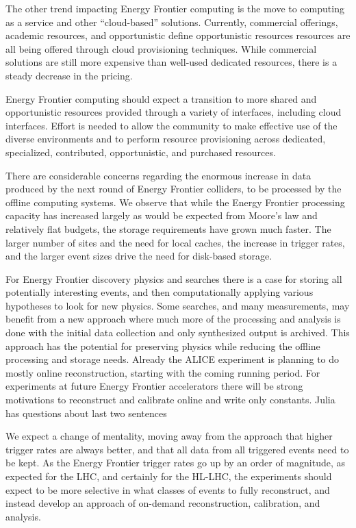 The other trend impacting Energy Frontier computing is the move to computing as a service
and other ``cloud-based'' solutions.  Currently,  commercial offerings, academic
resources, and opportunistic {\color{red} define opportunistic resources} resources are all being offered through cloud
provisioning techniques.  While commercial solutions are still more expensive
than well-used dedicated resources, there is a steady decrease in the pricing.

Energy Frontier computing should expect a transition to more shared and opportunistic
resources provided through a variety of interfaces, including cloud
interfaces.   Effort is needed to allow the community to make effective use of
the diverse environments and to perform resource provisioning across
dedicated, specialized, contributed, opportunistic, and purchased resources.

There are considerable concerns regarding the enormous increase in data
produced by the next round of Energy Frontier colliders,   to be processed by the offline
computing systems.  We observe that while the Energy Frontier processing capacity has
increased largely as would be expected from Moore's law and relatively
flat budgets, the storage requirements have grown much faster.  The larger
number of sites and the need for local caches, the increase in trigger rates,
and the larger event sizes drive the need for disk-based storage.

For Energy Frontier discovery physics and searches there is a case for storing all
potentially interesting events, and then computationally  applying various
hypotheses to look for new physics.  
Some searches, and many measurements, may benefit from a
new approach where much more of the processing and analysis is done with the
initial data collection and only synthesized output is archived.
This approach has the
potential for preserving physics while reducing the offline processing and
storage needs.  Already the ALICE experiment is planning to do mostly online
reconstruction, starting with  the coming running period.   For experiments at
future Energy Frontier accelerators there will be strong motivations to reconstruct and
calibrate online and write only constants.
{\color{red} Julia has questions about last two sentences}

We expect a change of mentality, moving away from the approach that higher
trigger rates are always better, and that all data from  all triggered events
need to be kept.   As the Energy Frontier trigger rates go up by an order of magnitude,  as
expected for the LHC, and certainly for the HL-LHC,  the experiments
should expect to be more selective in what classes of events to fully
reconstruct,  and instead develop an approach of on-demand reconstruction,
calibration, and analysis.

